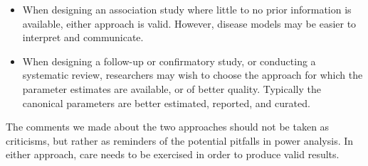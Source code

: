 \begin{itemize}
    \item When designing an association study where little to no prior information is available, either approach is valid. However, disease models may be easier to interpret and communicate.
    \item When designing a follow-up or confirmatory study, or conducting a systematic review, researchers may wish to choose the approach for which the parameter estimates are available, or of better quality. Typically the canonical parameters are better estimated, reported, and curated.
\end{itemize}
The comments we made about the two approaches should not be taken as criticisms, but rather as reminders of the potential pitfalls in power analysis.
In either approach, care needs to be exercised in order to produce valid results.

